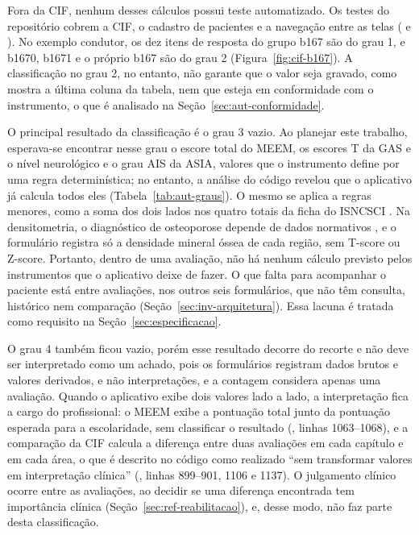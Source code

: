 Fora da CIF, nenhum desses cálculos possui teste automatizado. Os testes do repositório cobrem a CIF, o cadastro de
pacientes e a navegação entre as telas ( e ). No exemplo condutor, os dez itens de
resposta do grupo b167 são do grau 1, e b1670, b1671 e o próprio b167 são do grau 2 (Figura~\ref{fig:cif-b167}). A
classificação no grau 2, no entanto, não garante que o valor seja gravado, como mostra a última coluna da tabela, nem
que esteja em conformidade com o instrumento, o que é analisado na Seção~\ref{sec:aut-conformidade}.

O principal resultado da classificação é o grau 3 vazio. Ao planejar este trabalho, esperava-se encontrar nesse grau
o escore total do MEEM, os escores T da GAS e o nível neurológico e o grau AIS da ASIA, valores que o instrumento
define por uma regra determinística; no entanto, a análise do código revelou que o aplicativo já calcula todos eles
(Tabela~\ref{tab:aut-graus}). O mesmo se aplica a regras menores, como a soma dos dois lados nos quatro totais da
ficha do ISNCSCI \cite[p.~21]{rupp2021isncsci}. Na densitometria, o diagnóstico de osteoporose depende de dados
normativos \cite{morse2019bone}, e o formulário registra só a densidade mineral óssea de cada região, sem T-score ou
Z-score. Portanto, dentro de uma avaliação, não há nenhum cálculo previsto pelos instrumentos que o aplicativo deixe
de fazer. O que falta para acompanhar o paciente está entre avaliações, nos outros seis formulários, que não têm
consulta, histórico nem comparação (Seção~\ref{sec:inv-arquitetura}). Essa lacuna é tratada como requisito na
Seção~\ref{sec:especificacao}.

O grau 4 também ficou vazio, porém esse resultado decorre do recorte e não deve ser interpretado como um achado, pois
os formulários registram dados brutos e valores derivados, e não interpretações, e a contagem considera apenas uma
avaliação. Quando o aplicativo exibe dois valores lado a lado, a interpretação fica a cargo do profissional: o MEEM
exibe a pontuação total junto da pontuação esperada para a escolaridade, sem classificar o resultado
(, linhas 1063--1068), e a comparação da CIF calcula a diferença entre duas avaliações em cada
capítulo e em cada área, o que é descrito no código como realizado ``sem transformar valores em interpretação
clínica'' (, linhas 899--901, 1106 e 1137). O julgamento clínico ocorre entre as avaliações, ao
decidir se uma diferença encontrada tem importância clínica (Seção~\ref{sec:ref-reabilitacao}), e, desse modo, não
faz parte desta classificação.

